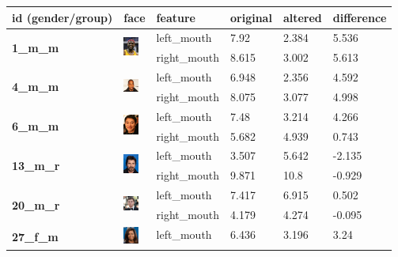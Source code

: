 \documentclass{l4proj}
\begin{document}
\begin{table}[h!]
\centering
\begin{tabular}{|l|l|l|l|l|l|}
\hline
\textbf{id (gender/group)} & \textbf{face} & \textbf{feature} & \textbf{original} & \textbf{altered} & \textbf{difference} \\ \hline
\multirow{2}{*}{\textbf{1\_m\_m}} & \multirow{2}{*}{\includegraphics[width=5mm]{images/01_m_m.jpg}} & left\_mouth & 7.92 & 2.384 & 5.536 \\ \cline{3-6} 
 &  & right\_mouth & 8.615 & 3.002 & 5.613 \\ \hline
\multirow{2}{*}{\textbf{4\_m\_m}} & \multirow{2}{*}{\includegraphics[width=5mm]{images/04_m_m.jpg}} & left\_mouth & 6.948 & 2.356 & 4.592 \\ \cline{3-6} 
 &  & right\_mouth & 8.075 & 3.077 & 4.998 \\ \hline
\multirow{2}{*}{\textbf{6\_m\_m}} & \multirow{2}{*}{\includegraphics[width=5mm]{images/06_m_m.jpg}} & left\_mouth & 7.48 & 3.214 & 4.266 \\ \cline{3-6} 
 &  & right\_mouth & 5.682 & 4.939 & 0.743 \\ \hline
\multirow{2}{*}{\textbf{13\_m\_r}} & \multirow{2}{*}{\includegraphics[width=5mm]{images/13_m_r.jpg}} & left\_mouth & 3.507 & 5.642 & -2.135 \\ \cline{3-6} 
 &  & right\_mouth & 9.871 & 10.8 & -0.929 \\ \hline
\multirow{2}{*}{\textbf{20\_m\_r}} & \multirow{2}{*}{\includegraphics[width=5mm]{images/20_m_r.jpg}} & left\_mouth & 7.417 & 6.915 & 0.502 \\ \cline{3-6} 
 &  & right\_mouth & 4.179 & 4.274 & -0.095 \\ \hline
\multirow{2}{*}{\textbf{27\_f\_m}} & \multirow{2}{*}{\includegraphics[width=5mm]{images/27_f_m.jpg}} & left\_mouth & 6.436 & 3.196 & 3.24 \\ \cline{3-6} 

\end{tabular}
\end{table}
\end{document}
